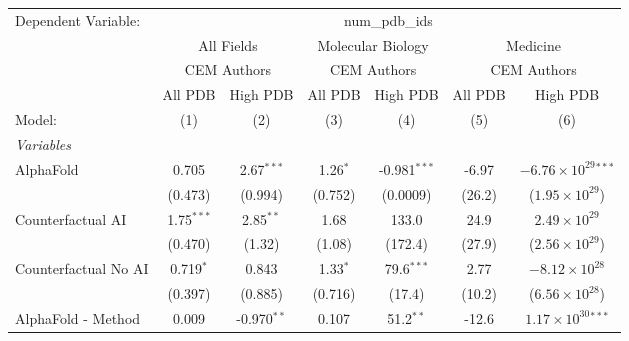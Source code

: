 \begingroup
\centering
\begin{tabular}{lcccccc}
   \tabularnewline \midrule \midrule
   Dependent Variable: & \multicolumn{6}{c}{num\_pdb\_ids}\\
 & \multicolumn{2}{c}{All Fields} & \multicolumn{2}{c}{Molecular Biology} & \multicolumn{2}{c}{Medicine} \\
\cmidrule(lr){2-3} \cmidrule(lr){4-5} \cmidrule(lr){6-7}
 & \multicolumn{2}{c}{CEM Authors} & \multicolumn{2}{c}{CEM Authors} & \multicolumn{2}{c}{CEM Authors} \\
\cmidrule(lr){2-3} \cmidrule(lr){4-5} \cmidrule(lr){6-7}
 & \multicolumn{1}{c}{All PDB} & \multicolumn{1}{c}{High PDB} & \multicolumn{1}{c}{All PDB} & \multicolumn{1}{c}{High PDB} & \multicolumn{1}{c}{All PDB} & \multicolumn{1}{c}{High PDB} \\
\cmidrule(lr){2-2} \cmidrule(lr){3-3} \cmidrule(lr){4-4} \cmidrule(lr){5-5} \cmidrule(lr){6-6} \cmidrule(lr){7-7}
   Model:                                                     & (1)           & (2)           & (3)        & (4)            & (5)          & (6)\\  
   \midrule
   \emph{Variables}\\
   AlphaFold                                                  & 0.705         & 2.67$^{***}$  & 1.26$^{*}$ & -0.981$^{***}$ & -6.97        & $-6.76\times 10^{29}$$^{***}$\\    
                                                              & (0.473)       & (0.994)       & (0.752)    & (0.0009)       & (26.2)       & ($1.95\times 10^{29}$)\\    
   Counterfactual AI                                          & 1.75$^{***}$  & 2.85$^{**}$   & 1.68       & 133.0          & 24.9         & $2.49\times 10^{29}$\\    
                                                              & (0.470)       & (1.32)        & (1.08)     & (172.4)        & (27.9)       & ($2.56\times 10^{29}$)\\    
   Counterfactual No AI                                       & 0.719$^{*}$   & 0.843         & 1.33$^{*}$ & 79.6$^{***}$   & 2.77         & $-8.12\times 10^{28}$\\    
                                                              & (0.397)       & (0.885)       & (0.716)    & (17.4)         & (10.2)       & ($6.56\times 10^{28}$)\\    
   AlphaFold - Method                                         & 0.009         & -0.970$^{**}$ & 0.107      & 51.2$^{**}$    & -12.6        & $1.17\times 10^{30}$$^{***}$\\    

\end{tabular}

